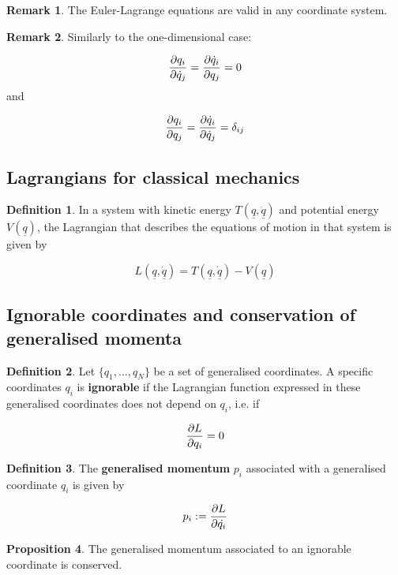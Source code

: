 \documentclass[12pt,a4paper]{article}
\theoremstyle{definition}
\newtheorem{definition}{Definition}[subsection]
\newtheorem{proposition}[definition]{Proposition}
\newtheorem*{remark}{Remark}
\begin{document}
\begin{remark}
	The Euler-Lagrange equations are valid in any coordinate system.
\end{remark}

\begin{remark}
	Similarly to the one-dimensional case:

	\[ \diffp{q_i}{\dot{q}_j} = \diffp{\dot{q}_i}{q_j} = 0 \]
	and

	\[ \diffp{q_i}{q_j} = \diffp{\dot{q}_i}{\dot{q}_j} = \delta_{ij} \]
\end{remark}

\subsection{Lagrangians for classical mechanics}

\begin{definition}
	In a system with kinetic energy $T(\underline{q}, \underline{\dot{q}})$ and potential energy $V(\underline{q})$, the Lagrangian that describes the equations of motion in that system is given by

	\[ L(\underline{q}, \underline{\dot{q}}) = T(\underline{q}, \underline{\dot{q}}) - V(\underline{q}) \]
\end{definition}

\subsection{Ignorable coordinates and conservation of generalised momenta}

\begin{definition}
	Let $\{ q_1, \dots, q_N \}$ be a set of generalised coordinates. A specific coordinates $q_i$ is \textbf{ignorable} if the Lagrangian function expressed in these generalised coordinates does not depend on $q_i$, i.e. if

	\[ \diffp{L}{q_i} = 0 \]
\end{definition}

\begin{definition}
	The \textbf{generalised momentum} $p_i$ associated with a generalised coordinate $q_i$ is given by

	\[ p_i := \diffp{L}{\dot{q_i}} \]
\end{definition}

\begin{proposition}
	The generalised momentum associated to an ignorable coordinate is conserved.
\end{proposition}
\end{document}
